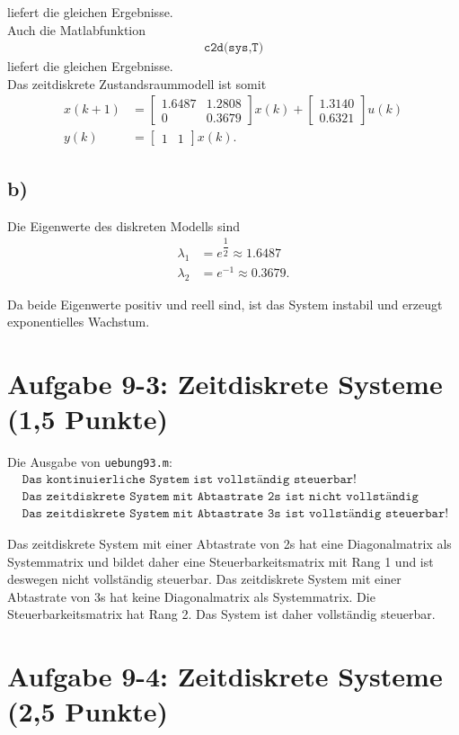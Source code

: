 \documentclass[11pt]{scrartcl} %
\begin{document}
liefert die gleichen Ergebnisse.\\

Auch die Matlabfunktion
\begin{align*}
\texttt{c2d(sys,T)}
\end{align*}
liefert die gleichen Ergebnisse.\\

Das zeitdiskrete Zustandsraummodell ist somit
\begin{align*}
x\left(k+1\right) &= \begin{bmatrix}
1.6487 & 1.2808 \\
0 & 0.3679
\end{bmatrix} x\left(k\right) + \begin{bmatrix}
1.3140 \\
0.6321
\end{bmatrix} u\left(k\right) \\
y\left(k\right) &= \begin{bmatrix}
1 & 1
\end{bmatrix} x\left(k\right).
\end{align*}


\subsection*{b)}
Die  Eigenwerte des diskreten Modells sind
\begin{align*}
\lambda_1 &= e^{\dfrac{1}{2}} \approx 1.6487 \\
\lambda_2 &= e^{-1} \approx 0.3679.
\end{align*}

Da beide Eigenwerte positiv und reell sind, ist das System instabil und erzeugt exponentielles Wachstum.



\section*{Aufgabe 9-3: Zeitdiskrete Systeme (1,5 Punkte)}
Die Ausgabe von \verb+uebung93.m+:
\begin{align*}
&\texttt{Das kontinuierliche System ist vollständig steuerbar!} \\
&\texttt{Das zeitdiskrete System mit Abtastrate 2s ist nicht vollständig steuerbar!} \\
&\texttt{Das zeitdiskrete System mit Abtastrate 3s ist vollständig steuerbar!}
\end{align*}

Das zeitdiskrete System mit einer Abtastrate von 2s hat eine Diagonalmatrix als Systemmatrix und bildet daher eine Steuerbarkeitsmatrix mit Rang 1 und ist deswegen nicht vollständig steuerbar.
Das zeitdiskrete System mit einer Abtastrate von 3s hat keine Diagonalmatrix als Systemmatrix. Die Steuerbarkeitsmatrix hat Rang 2. Das System ist daher vollständig steuerbar.


\section*{Aufgabe 9-4: Zeitdiskrete Systeme (2,5 Punkte)}

\newpage



\end{document}
